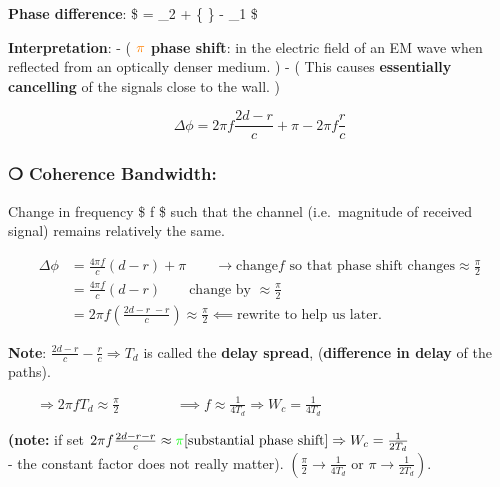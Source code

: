 \documentclass[11pt]{article}
\begin{document}
\textbf{Phase difference}: \$ \Delta \phi = \phi\_2 + \{\color{orange}
\pi \} - \phi\_1 \$

\textbf{Interpretation}: - ( \textbf{\({\color{orange} \pi }\) phase
shift}: in the electric field of an EM wave when reflected from an
optically denser medium. ) - ( This causes \textbf{essentially
cancelling} of the signals close to the wall. )

\[
\Delta \phi = 2 \pi f \frac{2d - r}{c} + \pi - 2 \pi f \frac{r}{c}
\]

    \subsubsection{\texorpdfstring{❍ \textbf{Coherence
Bandwidth:}}{❍ Coherence Bandwidth:}}\label{coherence-bandwidth}

Change in frequency \$ f \$ such that the channel (i.e.~magnitude of
received signal) remains relatively the same.

\begin{align}
\Delta \phi &= \frac{4 \pi f }{c} (d - r) + \pi \qquad \to \text{change} f \text{ so that phase shift changes} \approx \frac{\pi}{2} \\
&= \frac{4 \pi f}{c} ( d - r ) \qquad \text{change by } \approx \frac{\pi}{2} \\
&=2 \pi f \left( \frac{2d - r \; - r}{c} \right) \approx \frac{\pi}{2} \impliedby \text{rewrite to help us later.}
\end{align}

\textbf{Note}: \(\frac{2d - r}{c} - \frac{r}{c} \Rightarrow T_d\) is
called the \textbf{delay spread}, (\textbf{difference in delay} of the
paths).

\(\qquad \Rightarrow 2 \pi f T_d \approx \frac{\pi}{2}  \qquad \qquad  \implies f \approx \frac{1}{4 T_d} \Rightarrow W_c = \frac{1}{4 T_d}\)

\textbf{(note:} if set
\(2\pi f \frac{2d-r-r}{c} \approx {\color{green}\pi } \text{[substantial phase shift]} \Rightarrow W_c = \frac{1}{2T_d}\)\\
- the constant factor does not really matter).
\(( \frac{\pi}{2} \to \frac{1}{4T_d} \text{ or } \pi \to \frac{1}{2T_d}).\)
\end{document}
